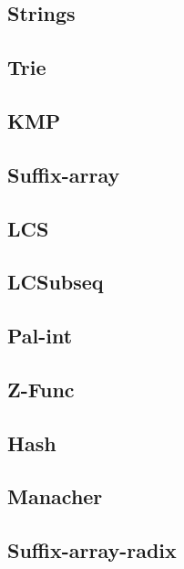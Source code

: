 \documentclass{article}
\newcommand\includes[2]{ %
   \subsection{#1}
   
}
\begin{document}
\begin{multicols}{2}
\section{Strings}
\includes{Trie}{C++/Strings/Trie.cpp}
\includes{KMP}{C++/Strings/KMP.cpp}
\includes{Suffix-array}{C++/Strings/Suffix-array.cpp}
\includes{LCS}{C++/Strings/LCS.cpp}
\includes{LCSubseq}{C++/Strings/LCSubseq.cpp}
\includes{Pal-int}{C++/Strings/Pal-int.cpp}
\includes{Z-Func}{C++/Strings/Z-Func.cpp}
\includes{Hash}{C++/Strings/Hash.cpp}
\includes{Manacher}{C++/Strings/Manacher.cpp}
\includes{Suffix-array-radix}{C++/Strings/Suffix-array-radix.cpp}

\end{multicols}
\end{document}
